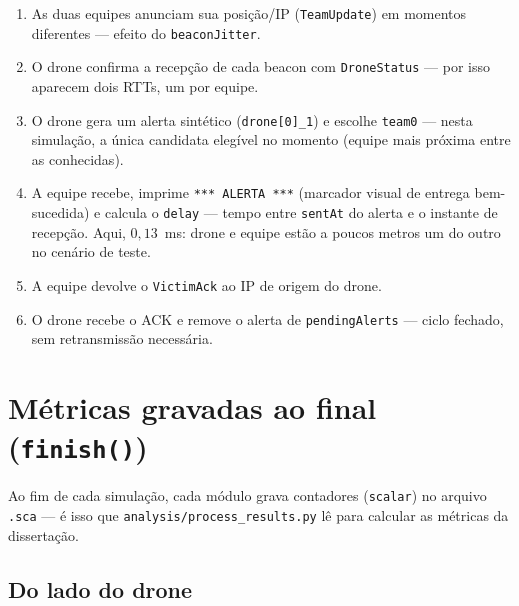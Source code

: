 \documentclass[11pt,a4paper]{article}
\begin{document}
\begin{explica}
\begin{enumerate}[leftmargin=1.3em, itemsep=2pt]
  \item As duas equipes anunciam sua posição/IP (\texttt{TeamUpdate}) em
  momentos diferentes --- efeito do \texttt{beaconJitter}.
  \item O drone confirma a recepção de cada beacon com \texttt{DroneStatus}
  --- por isso aparecem dois RTTs, um por equipe.
  \item O drone gera um alerta sintético (\texttt{drone[0]\_1}) e escolhe
  \texttt{team0} --- nesta simulação, a única candidata elegível no momento
  (equipe mais próxima entre as conhecidas).
  \item A equipe recebe, imprime \texttt{*** ALERTA ***} (marcador visual de
  entrega bem-sucedida) e calcula o \texttt{delay} --- tempo entre
  \texttt{sentAt} do alerta e o instante de recepção. Aqui, $0{,}13$~ms:
  drone e equipe estão a poucos metros um do outro no cenário de teste.
  \item A equipe devolve o \texttt{VictimAck} ao IP de origem do drone.
  \item O drone recebe o ACK e remove o alerta de \texttt{pendingAlerts} ---
  ciclo fechado, sem retransmissão necessária.
\end{enumerate}
\end{explica}

\newpage
\section{Métricas gravadas ao final (\texttt{finish()})}

Ao fim de cada simulação, cada módulo grava contadores (\texttt{scalar}) no
arquivo \texttt{.sca} --- é isso que \texttt{analysis/process\_results.py}
lê para calcular as métricas da dissertação.

\subsection{Do lado do drone}
\end{document}
